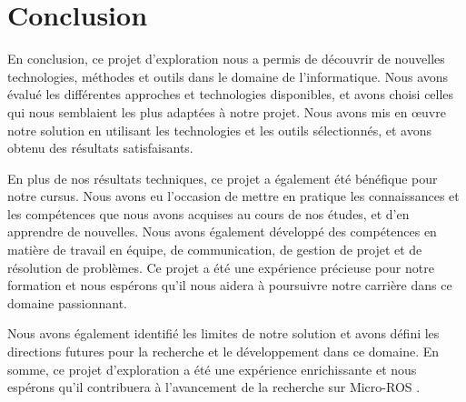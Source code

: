 	\chapter{Conclusion}
 
En conclusion, ce projet d'exploration nous a permis de découvrir de nouvelles technologies, méthodes et outils dans le domaine de 
l'informatique. Nous avons évalué les différentes approches et technologies disponibles, et avons choisi celles qui nous 
semblaient les plus adaptées à notre projet. Nous avons mis en œuvre notre solution en utilisant les technologies et les outils 
sélectionnés, et avons obtenu des résultats satisfaisants. 
\linebreak

En plus de nos résultats techniques, ce projet a également été bénéfique pour notre cursus. Nous avons eu l'occasion de mettre en 
pratique les connaissances et les compétences que nous avons acquises au cours de nos études, et d'en apprendre de nouvelles.
Nous avons également développé des compétences en matière de travail en équipe, de communication, de gestion de projet et de 
résolution de problèmes. Ce projet a été une expérience précieuse pour notre formation et nous espérons qu'il nous aidera à poursuivre
notre carrière dans ce domaine passionnant. 
\linebreak

Nous avons également identifié les limites de notre solution et avons défini les directions futures pour la recherche et le 
développement dans ce domaine. En somme, ce projet d'exploration a été une expérience enrichissante et nous espérons qu'il contribuera 
à l'avancement de la recherche sur Micro-ROS . 